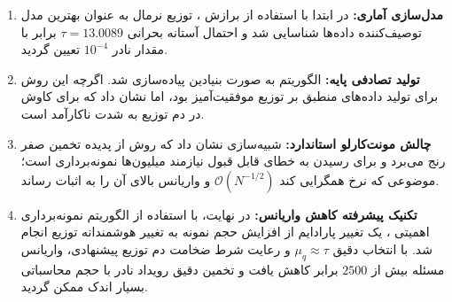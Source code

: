 \documentclass[12pt,a4paper]{article}
\begin{document}
	\begin{enumerate}
		\item \textbf{مدل‌سازی آماری:} در ابتدا با استفاده از برازش ، توزیع نرمال به عنوان بهترین مدل توصیف‌کننده داده‌ها شناسایی شد و احتمال آستانه بحرانی $\tau = 13.0089$ برابر با مقدار نادر $10^{-4}$ تعیین گردید.
		\item \textbf{تولید تصادفی پایه:} الگوریتم  به صورت بنیادین پیاده‌سازی شد. اگرچه این روش برای تولید داده‌های منطبق بر توزیع موفقیت‌آمیز بود، اما نشان داد که برای کاوش در دم توزیع به شدت ناکارآمد است.
		\item \textbf{چالش مونت‌کارلو استاندارد:} شبیه‌سازی نشان داد که روش  از پدیده تخمین صفر رنج می‌برد و برای رسیدن به خطای قابل قبول نیازمند میلیون‌ها نمونه‌برداری است؛ موضوعی که نرخ همگرایی کند $\mathcal{O}(N^{-1/2})$ و واریانس بالای آن را به اثبات رساند.
		\item \textbf{تکنیک پیشرفته کاهش واریانس:} در نهایت، با استفاده از الگوریتم نمونه‌برداری اهمیتی ، یک تغییر پارادایم از افزایش حجم نمونه به تغییر هوشمندانه توزیع انجام شد. با انتخاب دقیق $\mu_q \approx \tau$ و رعایت شرط ضخامت دم توزیع پیشنهادی، واریانس مسئله بیش از $2500$ برابر کاهش یافت و تخمین دقیق رویداد نادر با حجم محاسباتی بسیار اندک ممکن گردید.
	\end{enumerate}
	
	
	
	
\end{document}
